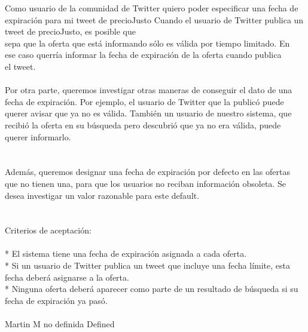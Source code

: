 	{Como usuario de la comunidad de Twitter quiero poder especificar una fecha de expiración para mi tweet de precioJusto} %
	{Cuando el usuario de Twitter publica un tweet de precioJusto, es posible que\\
sepa que la oferta que está informando sólo es válida por tiempo limitado. En\\
ese caso querría informar la fecha de expiración de la oferta cuando publica\\
el tweet.\\
\\
Por otra parte, queremos investigar otras maneras de conseguir el dato de una\\
fecha de expiración. Por ejemplo, el usuario de Twitter que la publicó puede\\
querer avisar que ya no es válida. También un usuario de nuestro sistema, que\\
recibió la oferta en su búsqueda pero descubrió que ya no era válida, puede\\
querer informarlo.\\
\\
  \\
Además, queremos designar una fecha de expiración por defecto en las ofertas\\
que no tienen una, para que los usuarios no reciban información obsoleta. Se\\
desea investigar un valor razonable para este default.\\
\\
  \\
Criterios de aceptación:\\
\\
* El sistema tiene una fecha de expiración asignada a cada oferta.  \\
* Si un usuario de Twitter publica un tweet que incluye una fecha límite, esta fecha deberá asignarse a la oferta.  \\
* Ninguna oferta deberá aparecer como parte de un resultado de búsqueda si su fecha de expiración ya pasó.\\
\\
} %
	{} %
	{} %
	{Martin M} %
	{no definida} %
	{Defined} %


\vspace{20pt}

